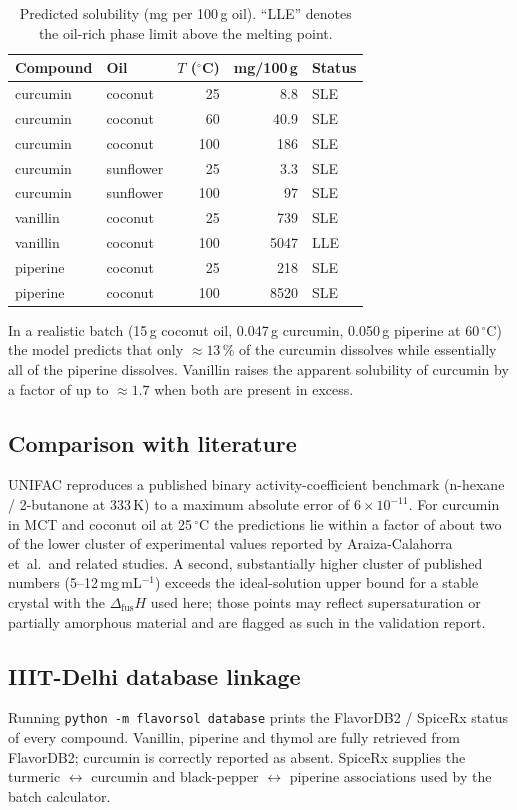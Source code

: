 \documentclass[twocolumn,10pt]{article}
\begin{document}
\begin{table}[t]
\centering
\caption{Predicted solubility (mg per 100\,g oil). ``LLE'' denotes the oil-rich phase limit above the melting point.}
\label{tab:sol}
\begin{tabular}{llrrl}
\toprule
Compound & Oil & $T$ ($^\circ$C) & mg/100\,g & Status \\
\midrule
curcumin & coconut & 25 & 8.8 & SLE \\
curcumin & coconut & 60 & 40.9 & SLE \\
curcumin & coconut & 100 & 186 & SLE \\
curcumin & sunflower & 25 & 3.3 & SLE \\
curcumin & sunflower & 100 & 97 & SLE \\
vanillin & coconut & 25 & 739 & SLE \\
vanillin & coconut & 100 & 5047 & LLE \\
piperine & coconut & 25 & 218 & SLE \\
piperine & coconut & 100 & 8520 & SLE \\
\bottomrule
\end{tabular}
\end{table}

In a realistic batch (15\,g coconut oil, 0.047\,g curcumin, 0.050\,g piperine at 60\,$^\circ$C) the model predicts that only $\approx 13\,\%$ of the curcumin dissolves while essentially all of the piperine dissolves. Vanillin raises the apparent solubility of curcumin by a factor of up to $\approx 1.7$ when both are present in excess.

\subsection{Comparison with literature}
UNIFAC reproduces a published binary activity-coefficient benchmark (n-hexane / 2-butanone at 333\,K) to a maximum absolute error of $6\times10^{-11}$. For curcumin in MCT and coconut oil at 25\,$^\circ$C the predictions lie within a factor of about two of the lower cluster of experimental values reported by Araiza-Calahorra et~al.\ and related studies. A second, substantially higher cluster of published numbers (5--12\,mg\,mL$^{-1}$) exceeds the ideal-solution upper bound for a stable crystal with the $\Delta_{\mathrm{fus}}H$ used here; those points may reflect supersaturation or partially amorphous material and are flagged as such in the validation report.

\subsection{IIIT-Delhi database linkage}
Running \texttt{python -m flavorsol database} prints the FlavorDB2 / SpiceRx status of every compound. Vanillin, piperine and thymol are fully retrieved from FlavorDB2; curcumin is correctly reported as absent. SpiceRx supplies the turmeric $\leftrightarrow$ curcumin and black-pepper $\leftrightarrow$ piperine associations used by the batch calculator.
\end{document}

